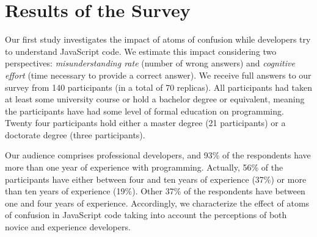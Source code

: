 

\section{Results of the Survey}
\label{sec:survey-resuts} 

Our first study investigates the impact of atoms of confusion while developers try to understand JavaScript code.
We estimate this impact considering two perspectives: \emph{misunderstanding rate} (number of wrong answers)
and \emph{cognitive effort} (time necessary to provide a correct answer). We receive full answers to our survey
from 140 participants (in a total of 70 replicas).
All participants had taken at least some university course or hold a bachelor
degree or equivalent, meaning the participants have had some
level of formal education on programming.
Twenty four participants hold either a master degree (21 participants) or a doctorate degree
(three participants). 



  

Our audience comprises professional developers,
and 93\% of the respondents have more than one year of experience with programming.
Actually, 56\% of the participants have either between four and ten years of experience (37\%)
or more than ten years of experience (19\%). Other 37\% of the respondents have between one and four years of experience.
Accordingly, we characterize the effect of atoms of confusion in JavaScript
code taking into account the perceptions of both novice and experience developers. 

